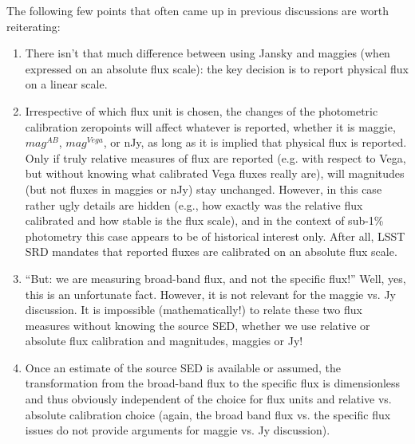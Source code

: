 \documentclass{emulateapj}
\begin{document}
The following few points that often came up in previous discussions are worth reiterating: 
\begin{enumerate}
\item There isn't that much difference between using Jansky and maggies (when expressed
on an absolute flux scale): the key decision is to report physical flux on a linear scale.
\item Irrespective of which flux unit is chosen, the changes of the photometric 
calibration zeropoints will affect whatever is reported, whether it is maggie, $mag^{AB}$, 
$mag^{Vega}$, or nJy, as long as it is implied that physical flux is reported. Only if
truly relative measures of flux are reported (e.g. with respect to Vega, but without knowing 
what calibrated Vega fluxes really are), will magnitudes (but not fluxes in maggies or 
nJy) stay unchanged. However, in this case rather ugly details are hidden (e.g., how 
exactly was the relative flux calibrated and how stable is the flux scale), and in the context 
of sub-1\% photometry this case appears to be of historical interest only. After all,
LSST SRD mandates that reported fluxes are calibrated on an absolute flux scale. 
\item ``But: we are measuring broad-band flux, and not the specific flux!''  Well, 
yes, this is an unfortunate fact. However, it is not relevant for the maggie vs. Jy discussion. 
It is impossible (mathematically!) to relate these two flux measures without knowing 
the source SED, whether we use relative or absolute flux calibration and magnitudes, 
maggies or Jy! 
\item Once an estimate of the source SED is available or assumed, the transformation from
the broad-band flux to the specific flux is dimensionless and thus obviously independent 
of the choice for flux units and relative vs. absolute calibration choice (again, the broad band 
flux vs. the specific flux issues do not provide arguments for maggie vs. Jy discussion).
\end{enumerate}
\end{document}
